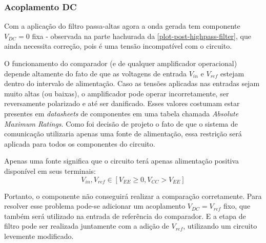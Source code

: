 	\subsubsection*{Acoplamento DC}\label{section:dc-bias}
	Com a aplicação do filtro passa-altas agora a onda gerada tem componente $V_{DC} = 0$ fixa - observada na parte hachurada da \autoref{plot-post-highpass-filter}, que ainda necessita correção, pois é uma tensão incompatível com o circuito.

	O funcionamento do comparador (e de qualquer amplificador operacional) depende altamente do fato de que as voltagens de entrada $V_{in}$ e $V_{ref}$ estejam dentro do intervalo de alimentação. Caso as tensões aplicadas nas entradas sejam muito altas (ou baixas), o amplificador pode operar incorretamente, ser reversamente polarizado e até ser danificado. Esses valores costumam estar presentes em \textit{datasheets} de componentes em uma tabela chamada \emph{Absolute Maximum Ratings}. Como foi decisão de projeto o fato de que o sistema de comunicação utilizaria apenas uma fonte de alimentação, essa restrição será aplicada para todos os componentes do circuito.

	Apenas uma fonte significa que o circuito terá apenas alimentação positiva disponível em seus terminais:
	\begin{equation}
	V_{in}, V_{ref} \in [V_{EE} \geq 0, V_{CC} > V_{EE}]
	\end{equation}

	Portanto, o componente não conseguirá realizar a comparação corretamente. Para resolver esse problema pode-se adicionar um acoplamento $V_{DC} = V_{ref}$ fixo, que também será utilizado na entrada de referência do comparador. E a etapa de filtro pode ser realizada juntamente com a adição de $V_{ref}$, utilizando um circuito levemente modificado.


